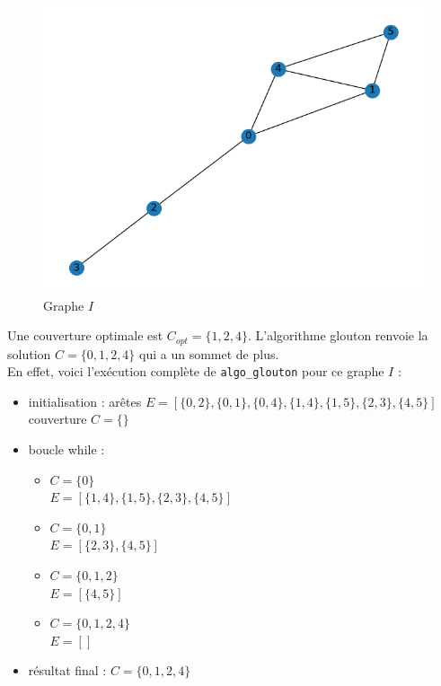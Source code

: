 \documentclass[12pt]{article}
\begin{document}
        \begin{figure}[h]
            \caption{Graphe $I$}
            \includegraphics[scale=0.6]{figures/q3-1.png}
            \centering
        \end{figure}

        Une couverture optimale est $C_{opt} = \{1,2,4\}$. L'algorithme glouton renvoie la solution $C = \{0,1,2,4\}$ qui a un sommet de plus. \\
        En effet, voici l'exécution complète de \texttt{algo\_glouton} pour ce graphe $I$ :

        \begin{itemize}
            \item initialisation : arêtes $E = [\{0,2\},\{0,1\},\{0,4\},\{1,4\},\{1,5\},\{2,3\},\{4,5\}]$ \\
            couverture $C = \{\}$
            \item boucle while :
                \begin{itemize}
                    \item $C = \{0\}$ \\
                    $E = [\{1,4\},\{1,5\},\{2,3\},\{4,5\}]$
                    \item $C = \{0,1\}$ \\
                    $E = [\{2,3\},\{4,5\}]$
                    \item $C = \{0,1,2\}$ \\
                    $E = [\{4,5\}]$
                    \item $C = \{0,1,2,4\}$ \\
                    $E = []$
                \end{itemize}
            \item résultat final : $C = \{0,1,2,4\}$
        \end{itemize}
\end{document}
